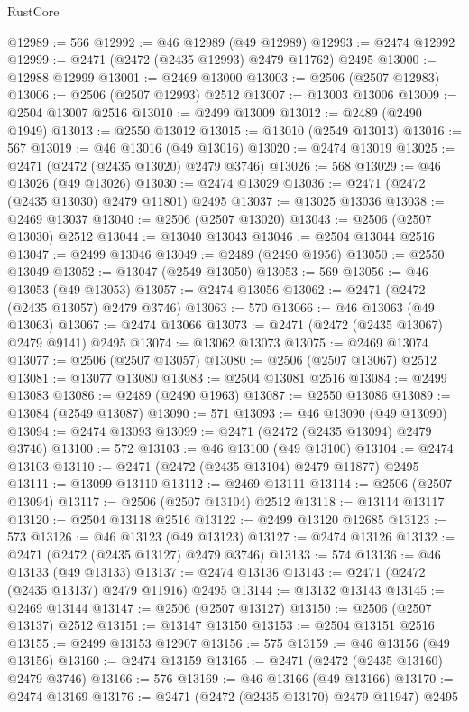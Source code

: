 \begin{lexlean}{RustCore}
\begin{coremodule}
@12989 := 566
@12992 := @46 @12989 (@49 @12989)
@12993 := @2474 @12992
@12999 := @2471 (@2472 (@2435 @12993) @2479 @11762) @2495
@13000 := @12988 @12999
@13001 := @2469 @13000
@13003 := @2506 (@2507 @12983)
@13006 := @2506 (@2507 @12993) @2512
@13007 := @13003 @13006
@13009 := @2504 @13007 @2516
@13010 := @2499 @13009
@13012 := @2489 (@2490 @1949)
@13013 := @2550 @13012
@13015 := @13010 (@2549 @13013)
@13016 := 567
@13019 := @46 @13016 (@49 @13016)
@13020 := @2474 @13019
@13025 := @2471 (@2472 (@2435 @13020) @2479 @3746)
@13026 := 568
@13029 := @46 @13026 (@49 @13026)
@13030 := @2474 @13029
@13036 := @2471 (@2472 (@2435 @13030) @2479 @11801) @2495
@13037 := @13025 @13036
@13038 := @2469 @13037
@13040 := @2506 (@2507 @13020)
@13043 := @2506 (@2507 @13030) @2512
@13044 := @13040 @13043
@13046 := @2504 @13044 @2516
@13047 := @2499 @13046
@13049 := @2489 (@2490 @1956)
@13050 := @2550 @13049
@13052 := @13047 (@2549 @13050)
@13053 := 569
@13056 := @46 @13053 (@49 @13053)
@13057 := @2474 @13056
@13062 := @2471 (@2472 (@2435 @13057) @2479 @3746)
@13063 := 570
@13066 := @46 @13063 (@49 @13063)
@13067 := @2474 @13066
@13073 := @2471 (@2472 (@2435 @13067) @2479 @9141) @2495
@13074 := @13062 @13073
@13075 := @2469 @13074
@13077 := @2506 (@2507 @13057)
@13080 := @2506 (@2507 @13067) @2512
@13081 := @13077 @13080
@13083 := @2504 @13081 @2516
@13084 := @2499 @13083
@13086 := @2489 (@2490 @1963)
@13087 := @2550 @13086
@13089 := @13084 (@2549 @13087)
@13090 := 571
@13093 := @46 @13090 (@49 @13090)
@13094 := @2474 @13093
@13099 := @2471 (@2472 (@2435 @13094) @2479 @3746)
@13100 := 572
@13103 := @46 @13100 (@49 @13100)
@13104 := @2474 @13103
@13110 := @2471 (@2472 (@2435 @13104) @2479 @11877) @2495
@13111 := @13099 @13110
@13112 := @2469 @13111
@13114 := @2506 (@2507 @13094)
@13117 := @2506 (@2507 @13104) @2512
@13118 := @13114 @13117
@13120 := @2504 @13118 @2516
@13122 := @2499 @13120 @12685
@13123 := 573
@13126 := @46 @13123 (@49 @13123)
@13127 := @2474 @13126
@13132 := @2471 (@2472 (@2435 @13127) @2479 @3746)
@13133 := 574
@13136 := @46 @13133 (@49 @13133)
@13137 := @2474 @13136
@13143 := @2471 (@2472 (@2435 @13137) @2479 @11916) @2495
@13144 := @13132 @13143
@13145 := @2469 @13144
@13147 := @2506 (@2507 @13127)
@13150 := @2506 (@2507 @13137) @2512
@13151 := @13147 @13150
@13153 := @2504 @13151 @2516
@13155 := @2499 @13153 @12907
@13156 := 575
@13159 := @46 @13156 (@49 @13156)
@13160 := @2474 @13159
@13165 := @2471 (@2472 (@2435 @13160) @2479 @3746)
@13166 := 576
@13169 := @46 @13166 (@49 @13166)
@13170 := @2474 @13169
@13176 := @2471 (@2472 (@2435 @13170) @2479 @11947) @2495

\end{coremodule}
\end{lexlean}
